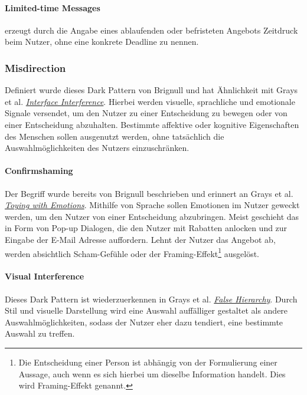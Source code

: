 \documentclass[a4paper]{article}
\begin{document}
\paragraph{Limited-time Messages}
\label{para:limited_time_message}
erzeugt durch die Angabe eines ablaufenden oder befristeten Angebots Zeitdruck beim Nutzer, ohne eine konkrete Deadline zu nennen.

\subsubsection{Misdirection}
\label{sssec:misdirection}
Definiert wurde dieses Dark Pattern von Brignull und hat Ähnlichkeit mit Grays et al. \hyperref[sssec:interface_interference]{\textit{Interface Interference}}.
Hierbei werden visuelle, sprachliche und emotionale Signale versendet, um den Nutzer zu einer Entscheidung zu bewegen oder von einer Entscheidung abzuhalten. Bestimmte affektive oder kognitive Eigenschaften des Menschen sollen ausgenutzt werden, ohne tatsächlich die Auswahlmöglichkeiten des Nutzers einzuschränken.

\paragraph{Confirmshaming}
\label{para:confirmshaming}
Der Begriff wurde bereits von Brignull beschrieben und erinnert an Grays et al. \hyperref[subpara:toying_with_emotions]{\textit{Toying with Emotions}}.\newline
Mithilfe von Sprache sollen Emotionen im Nutzer geweckt werden, um den Nutzer von einer Entscheidung abzubringen. Meist geschieht das in Form von Pop-up Dialogen, die den Nutzer mit Rabatten anlocken und zur Eingabe der E-Mail Adresse auffordern. Lehnt der Nutzer das Angebot ab, werden absichtlich Scham-Gefühle oder der Framing-Effekt\footnote{\label{foot:5} Die Entscheidung einer Person ist abhängig von der Formulierung einer Aussage, auch wenn es sich hierbei um dieselbe Information handelt. Dies wird Framing-Effekt genannt.}  ausgelöst.

\paragraph{Visual Interference}
\label{para:visual_interference}
Dieses Dark Pattern ist wiederzuerkennen in Grays et al. \hyperref[subpara:false_hierarchy]{\textit{False Hierarchy}}. 
Durch Stil und visuelle Darstellung wird eine Auswahl auffälliger gestaltet als andere Auswahlmöglichkeiten, sodass der Nutzer eher dazu tendiert, eine bestimmte Auswahl zu treffen.
\end{document}
